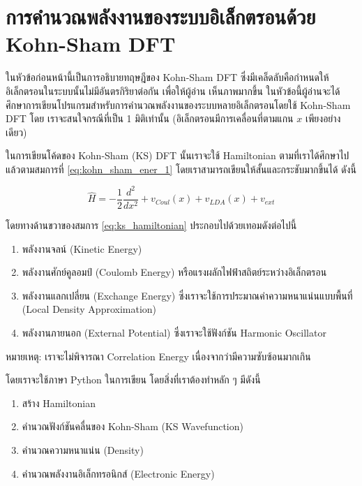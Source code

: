 \section{การคำนวณพลังงานของระบบอิเล็กตรอนด้วย Kohn-Sham DFT}
\label{sec:calc_ener_kohn_sham}

ในหัวข้อก่อนหน้านี้เป็นการอธิบายทฤษฎีของ Kohn-Sham DFT ซึ่งมีเคล็ดลับคือกำหนดให้อิเล็กตรอนในระบบนั้นไม่มีอันตรกิริยาต่อกัน เพื่อให้ผู้อ่าน%
เห็นภาพมากขึ้น ในหัวข้อนี้ผู้อ่านจะได้ศึกษาการเขียนโปรแกรมสำหรับการคำนวณพลังงานของระบบหลายอิเล็กตรอนโดยใช้ Kohn-Sham DFT โดย%
เราจะสนใจกรณีที่เป็น 1 มิติเท่านั้น (อิเล็กตรอนมีการเคลื่อนที่ตามแกน $x$ เพียงอย่างเดียว)

ในการเขียนโค้ดของ Kohn-Sham (KS) DFT นั้นเราจะใช้ Hamiltonian ตามที่เราได้ศึกษาไปแล้วตามสมการที่ \eqref{eq:kohn_sham_ener_1}
โดยเราสามารถเขียนให้สั้นและกระชับมากขึ้นได้ ดังนี้

\begin{equation}\label{eq:ks_hamiltonian}
    \hat{H} = -\frac{1}{2} \frac{d^2}{dx^2} + v_{Coul}(x) + v_{LDA}(x) + v_{ext}
\end{equation}

\noindent โดยทางด้านขวาของสมการ \eqref{eq:ks_hamiltonian} ประกอบไปด้วยเทอมดังต่อไปนี้

\begin{enumerate}[topsep=0pt,noitemsep]
    \item พลังงานจลน์ (Kinetic Energy)

    \item พลังงานศักย์คูลอมป์ (Coulomb Energy) หรือแรงผลักไฟฟ้าสถิตย์ระหว่างอิเล็กตรอน

    \item พลังงานแลกเปลี่ยน (Exchange Energy) ซึ่งเราจะใช้การประมาณค่าความหนาแน่นแบบพื้นที่ (Local Density Approximation)

    \item พลังงานภายนอก (External Potential) ซึ่งเราจะใช้ฟังก์ชัน Harmonic Oscillator
\end{enumerate}

\noindent หมายเหตุ: เราจะไม่พิจารณา Correlation Energy เนื่องจากว่ามีความซับซ้อนมากเกิน

โดยเราจะใช้ภาษา Python ในการเขียน โดยสิ่งที่เราต้องทำหลัก ๆ มีดังนี้

\begin{enumerate}[topsep=0pt,noitemsep]
    \item สร้าง Hamiltonian

    \item คำนวณฟังก์ชันคลื่นของ Kohn-Sham (KS Wavefunction)

    \item คำนวณความหนาแน่น (Density)

    \item คำนวณพลังงานอิเล็กทรอนิกส์ (Electronic Energy)
\end{enumerate}

